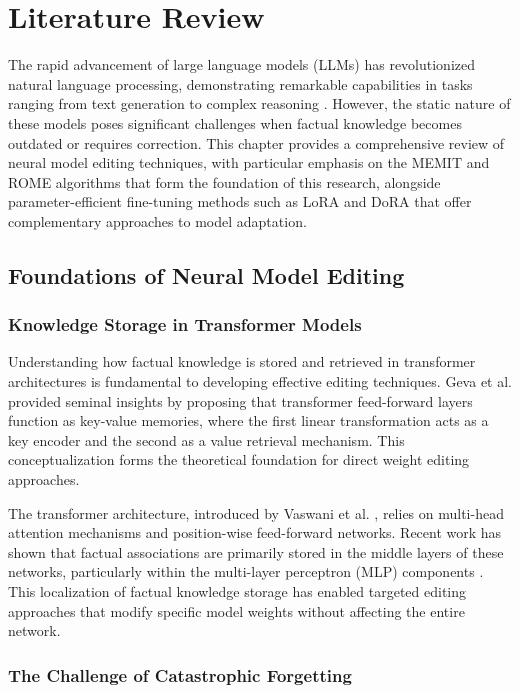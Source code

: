 \chapter{Literature Review}

The rapid advancement of large language models (LLMs) has revolutionized natural language processing, demonstrating remarkable capabilities in tasks ranging from text generation to complex reasoning \cite{brown_2020_language, touvron_2023_llama}. However, the static nature of these models poses significant challenges when factual knowledge becomes outdated or requires correction. This chapter provides a comprehensive review of neural model editing techniques, with particular emphasis on the MEMIT and ROME algorithms that form the foundation of this research, alongside parameter-efficient fine-tuning methods such as LoRA and DoRA that offer complementary approaches to model adaptation.

\section{Foundations of Neural Model Editing}

\subsection{Knowledge Storage in Transformer Models}

Understanding how factual knowledge is stored and retrieved in transformer architectures is fundamental to developing effective editing techniques. Geva et al. \cite{geva_2021_transformer} provided seminal insights by proposing that transformer feed-forward layers function as key-value memories, where the first linear transformation acts as a key encoder and the second as a value retrieval mechanism. This conceptualization forms the theoretical foundation for direct weight editing approaches.

The transformer architecture, introduced by Vaswani et al. \cite{vaswani_2017_attention}, relies on multi-head attention mechanisms and position-wise feed-forward networks. Recent work has shown that factual associations are primarily stored in the middle layers of these networks, particularly within the multi-layer perceptron (MLP) components \cite{petroni_2019_language, jiang_2020_how}. This localization of factual knowledge storage has enabled targeted editing approaches that modify specific model weights without affecting the entire network.

\subsection{The Challenge of Catastrophic Forgetting}

